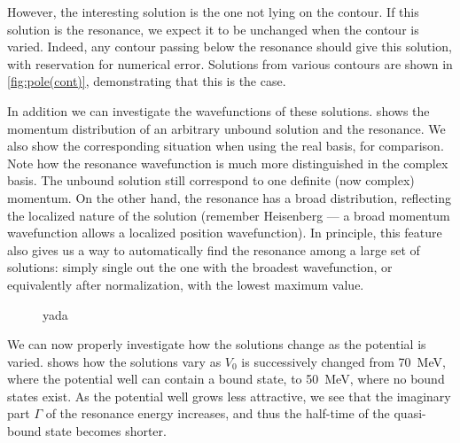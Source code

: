 \documentclass[../main/report.tex]{subfiles}
\begin{document}
However, the interesting solution is the one not lying on the contour. If this solution is the resonance, we expect it to be unchanged when the contour is varied. 
Indeed, any contour passing below the resonance should give this solution, with reservation for numerical error. 
Solutions from various contours are shown in \cref{fig:pole(cont)}, demonstrating that this is the case.

In addition we can investigate the wavefunctions of these solutions. 
 shows the momentum distribution of an arbitrary unbound solution and the resonance. We also show the corresponding situation when using the real basis, for comparison. Note how the resonance wavefunction is much more distinguished in the complex basis.  
The unbound solution still correspond to one definite (now complex) momentum. 
On the other hand, the resonance has a broad distribution, reflecting the localized nature of the solution 
(remember Heisenberg --- a broad momentum wavefunction allows a localized position wavefunction). 
In principle, this feature also gives us a way to automatically find the resonance among a large set of solutions: 
simply single out the one with the broadest wavefunction, or equivalently after normalization, with the lowest maximum value.


\begin{figure}[H]
\caption{yada} 
\label{fig:he5_eigvecs}
\end{figure}




We can now properly investigate how the solutions change as the potential is varied.  shows how the solutions vary as $V_0$ 
is successively changed from \SI{70}{MeV}, where the potential well can contain a bound state, to \SI{50}{MeV}, where no bound states exist. 
As the potential well grows less attractive, we see that the imaginary part $\Gamma$ of the resonance energy increases, and thus the half-time of the quasi-bound state becomes shorter.  
\end{document}
